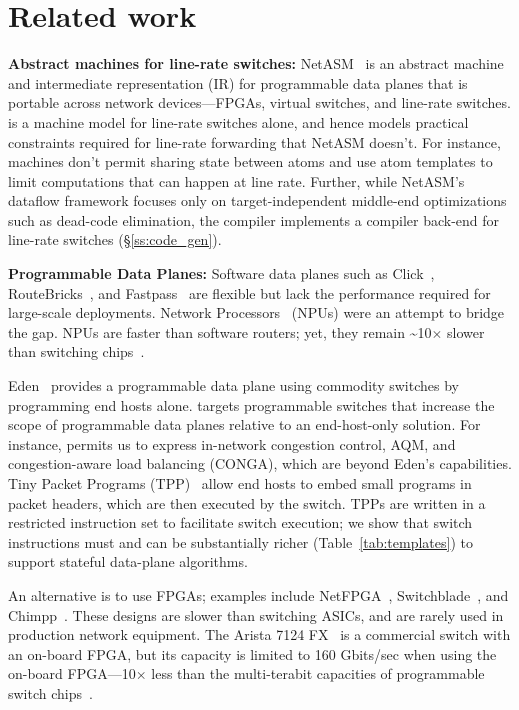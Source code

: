 \section{Related work}
\label{s:related}
\textbf{Abstract machines for line-rate switches:}
NetASM~\cite{netasm} is an abstract machine and intermediate representation
(IR) for programmable data planes that is portable across network
devices---FPGAs, virtual switches, and line-rate switches.  \absmachine is a
machine model for line-rate switches alone, and hence models practical
constraints required for line-rate forwarding that NetASM doesn't. For
instance, \absmachine machines don't permit sharing state between atoms and use
atom templates to limit computations that can happen at line rate. Further,
while NetASM's dataflow framework focuses only on target-independent middle-end
optimizations such as dead-code elimination, the \pktlanguage compiler
implements a compiler back-end for line-rate switches
(\S\ref{ss:code_gen}).

\textbf{Programmable Data Planes:}
Software data planes such as Click~\cite{click},
RouteBricks~\cite{routebricks}, and Fastpass~\cite{fastpass} are flexible but
lack the performance required for large-scale deployments. Network
Processors~\cite{ixp2800, ixp4xx} (NPUs) were an attempt to bridge the gap.
NPUs are faster than software routers; yet, they remain
\textasciitilde10$\times$ slower than switching chips~\cite{rmt}.

Eden~\cite{eden} provides a programmable data plane using commodity switches by
programming end hosts alone. \pktlanguage targets programmable switches that
increase the scope of programmable data planes relative to an end-host-only
solution. For instance, \pktlanguage permits us to express in-network
congestion control, AQM, and congestion-aware load balancing (CONGA), which are
beyond Eden's capabilities. Tiny Packet Programs (TPP)~\cite{tpp} allow end
hosts to embed small programs in packet headers, which are then executed by the
switch. TPPs are written in a restricted instruction set to facilitate switch
execution; we show that switch instructions must and can be substantially
richer (Table~\ref{tab:templates}) to support stateful data-plane algorithms.

An alternative is to use FPGAs; examples include NetFPGA~\cite{netfpga},
Switchblade~\cite{switchblade}, and Chimpp~\cite{chimpp}.  These designs are
slower than switching ASICs, and are rarely used in production network
equipment. The Arista 7124 FX~\cite{7124fx} is a commercial switch with an
on-board FPGA, but its capacity is limited to 160 Gbits/sec when using the
on-board FPGA---10$\times$ less than the multi-terabit capacities of programmable
switch chips~\cite{xpliant}.

